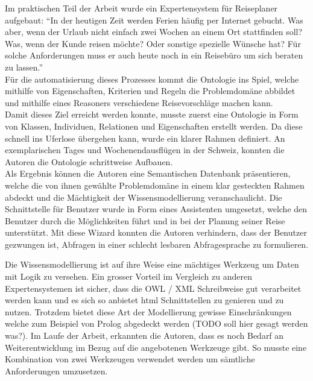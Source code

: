 Im praktischen Teil der Arbeit wurde ein Expertensystem für Reiseplaner aufgebaut: "`In der heutigen Zeit werden Ferien häufig per Internet gebucht. Was aber, wenn der Urlaub nicht einfach zwei Wochen an einem Ort stattfinden soll? Was, wenn der Kunde reisen möchte? Oder sonstige spezielle Wünsche hat? Für solche Anforderungen muss er auch heute noch in ein Reisebüro um sich beraten zu lassen."'\\
Für die automatisierung dieses Prozesses kommt die Ontologie ins Spiel, welche mithilfe von Eigenschaften, Kriterien und Regeln die Problemdomäne abbildet und mithilfe eines Reasoners verschiedene Reisevorschläge machen kann.\\
Damit dieses Ziel erreicht werden konnte, musste zuerst eine Ontologie in Form von Klassen, Individuen, Relationen und Eigenschaften erstellt werden. Da diese schnell ins Uferlose übergehen kann, wurde ein klarer Rahmen definiert. An exemplarischen Tages und Wochenendausflügen in der Schweiz, konnten die Autoren die Ontologie schrittweise Aufbauen. \\
Als Ergebnis können die Autoren eine Semantischen Datenbank präsentieren, welche die von ihnen gewählte Problemdomäne in einem klar gesteckten Rahmen abdeckt und die Mächtigkeit der Wissensmodellierung veranschaulicht. Die Schnittstelle für Benutzer wurde in Form eines Assistenten umgesetzt, welche den Benutzer durch die Möglichkeiten führt und in bei der Planung seiner Reise unterstützt. Mit diese Wizard konnten die Autoren verhindern, dass der Benutzer gezwungen ist, Abfragen in einer schlecht lesbaren Abfragesprache zu formulieren. 

Die Wissensmodellierung ist auf ihre Weise eine mächtiges Werkzeug um Daten mit Logik zu versehen. Ein grosser Vorteil im Vergleich zu anderen Expertensystemen ist sicher, dass die OWL / XML Schreibweise gut verarbeitet werden kann und es sich so anbietet html Schnittstellen zu genieren und zu nutzen. Trotzdem bietet diese Art der Modellierung gewisse Einschränkungen welche zum Beispiel von Prolog abgedeckt werden (TODO soll hier gesagt werden was?). Im Laufe der Arbeit, erkannten die Autoren, dass es noch Bedarf an Weiterentwicklung im Bezug auf die angebotenen Werkzeuge gibt. So musste eine Kombination von zwei Werkzeugen verwendet werden um sämtliche Anforderungen umzusetzen.




